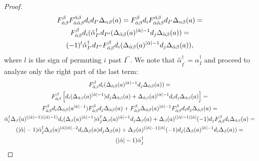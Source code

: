 \begin{cor}
\begin{proof}
\begin{gather*}
	F_{\bar\alpha\beta}^{\beta} F^{\bar\alpha\beta}_{\hat\alpha\bar\alpha\beta} d_i  d_{I^\prime} \Delta_{\alpha\beta}(a) = %
	F_{\bar\alpha\beta}^{\beta} d_i F^{\bar\alpha\beta}_{\hat\alpha\bar\alpha\beta}%
		d_{I^\prime} \Delta_{\alpha\beta}(a) = \\%
	F_{\bar\alpha\beta}^{\beta} d_i ( \hat\alpha^\dagger_{I^\prime} d_{I^{\prime\prime}}%
		( \Delta_{\bar\alpha\beta}(a)^{\abs{\hat\alpha}-1} %
		d_j \Delta_{\bar\alpha\beta}(a) ) = \\%
	(-1)^l \hat\alpha^\dagger_{I^\prime} d_{I^{\prime\prime}} F_{\bar\alpha\beta}^\beta %
		d_i ( \Delta_{\bar\alpha\beta}(a)^{\abs{\hat\alpha}-1} %
		d_j \Delta_{\bar\alpha\beta}(a) ),%
\end{gather*}
where $l$ is the sign of permuting $i$ past $I^{\prime\prime}$. We note that $\hat\alpha^\dagger_{I^\prime} = \alpha^\dagger_I$ and proceed to analyze only the right part of the last term:
\begin{gather*}
	F_{\bar\alpha\beta}^\beta d_i ( \Delta_{\bar\alpha\beta}(a)^{\abs{\hat\alpha}-1} %
		d_j \Delta_{\bar\alpha\beta}(a) ) = \\%
	F_{\bar\alpha\beta}^\beta \left[ %
    d_i ( \Delta_{\bar\alpha\beta}(a)^{\abs{\hat\alpha}-1} )%
    d_j \Delta_{\bar\alpha\beta}(a) + %
		\Delta_{\bar\alpha\beta}(a)^{\abs{\hat\alpha}-1} %
		d_i d_j \Delta_{\bar\alpha\beta}(a) \right] = \\
	F_{\bar\alpha\beta}^\beta d_i \Delta_{\bar\alpha\beta}(a^{\abs{\hat\alpha}-1}) %
    F_{\bar\alpha\beta}^\beta d_j \Delta_{\bar\alpha\beta}(a) + %
    F_{\bar\alpha\beta}^\beta \Delta_{\bar\alpha\beta}(a)^{\abs{\hat\alpha}-1} %
    F_{\bar\alpha\beta}^\beta d_i d_j \Delta_{\bar\alpha\beta}(a) = \\%
  \bar\alpha^\dagger_i %
    \Delta_{\beta} (a)^{(\abs{\hat\alpha}-1)(\abs{\bar\alpha}-1)} %
    d_i (\Delta_{\beta} (a)^{\abs{\hat\alpha}-1}) %
    \bar\alpha^\dagger_j %
    \Delta_{\beta} (a)^{\abs{\bar\alpha}-1} %
    d_j \Delta_\beta (a) %
    + %
    \Delta_\beta(a)^{(\abs{\hat\alpha}-1)\abs{\bar\alpha}} %
    (-1) d_j F_{\bar\alpha\beta}^\beta %
    d_i \Delta_{\bar\alpha\beta}(a) = \\%
  (\abs{\hat\alpha}-1)\bar\alpha^\dagger_j%
    \Delta_\beta(a)^{\abs{\hat\alpha}\abs{\bar\alpha} - 2} %
    d_i \Delta_\beta(a) d_j \Delta_\beta (a) %
    + %
    \Delta_\beta(a)^{(\abs{\hat\alpha}-1)\abs{\bar\alpha}} %
    (-1) d_j ( \Delta_\beta(a)^{\abs{\bar\alpha}-1} %
    d_i \Delta_\beta(a) ) = \\%
  (\abs{\hat\alpha}-1)\bar\alpha^\dagger_j%

\end{gather*}
\end{proof}
\end{cor}
